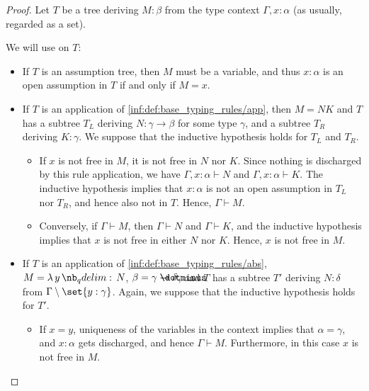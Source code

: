 \begin{proof}
   Let \( T \) be a tree deriving \( M: \beta \) from the type context \( \Gamma, x: \alpha \) (as usually, regarded as a set).

  We will use  on \( T \):
  \begin{itemize}
    \item If \( T \) is an assumption tree, then \( M \) must be a variable, and thus \( x: \alpha \) is an open assumption in \( T \) if and only if \( M = x \).

    \item If \( T \) is an application of \ref{inf:def:base_typing_rules/app}, then \( M = NK \) and \( T \) has a subtree \( T_L \) deriving \( N: \gamma \to \beta \) for some type \( \gamma \), and a subtree \( T_R \) deriving \( K: \gamma \). We suppose that the inductive hypothesis holds for \( T_L \) and \( T_R \).

    \begin{itemize}
      \item If \( x \) is not free in \( M \), it is not free in \( N \) nor \( K \). Since nothing is discharged by this rule application, we have \( \Gamma, x: \alpha \vdash N \) and \( \Gamma, x: \alpha \vdash K \). The inductive hypothesis implies that \( x: \alpha \) is not an open assumption in \( T_L \) nor \( T_R \), and hence also not in \( T \). Hence, \( \Gamma \vdash M \).

      \item Conversely, if \( \Gamma \vdash M \), then \( \Gamma \vdash N \) and \( \Gamma \vdash K \), and the inductive hypothesis implies that \( x \) is not free in either \( N \) nor \( K \). Hence, \( x \) is not free in \( M \).
    \end{itemize}

    \item If \( T \) is an application of \ref{inf:def:base_typing_rules/abs}, \( M = \qabs y N \), \( \beta = \gamma \synimplies \delta \), and \( T \) has a subtree \( T' \) deriving \( N: \delta \) from \( \Gamma \setminus \set{ y: \gamma } \). Again, we suppose that the inductive hypothesis holds for \( T' \).

    \begin{itemize}
      \item If \( x = y \), uniqueness of the variables in the context implies that \( \alpha = \gamma \), and \( x: \alpha \) gets discharged, and hence \( \Gamma \vdash M \). Furthermore, in this case \( x \) is not free in \( M \).


\end{itemize}
\end{itemize}
\end{proof}

